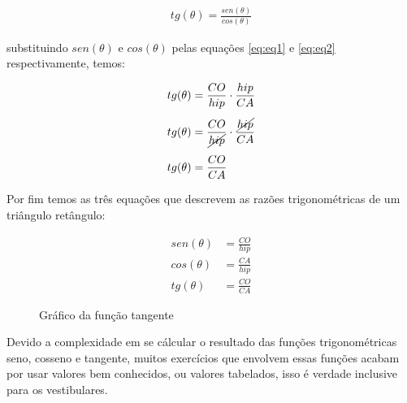 \begin{multicols*}{2}
    \begin{align*}
        tg(\theta) = \frac{sen(\theta)}{cos(\theta)}
    \end{align*}

    \noindent substituindo $sen(\theta)$ e $cos(\theta)$ pelas equações
    \eqref{eq:eq1} e \eqref{eq:eq2} respectivamente, temos:

    \begin{align}
        tg(\theta) & = \frac{CO}{hip}\cdot\frac{hip}{CA}                   \\[1ex]
        tg(\theta) & = \frac{CO}{\cancel{hip}}\cdot\frac{\cancel{hip}}{CA} \\[1ex]
        tg(\theta) & = \frac{CO}{CA}
    \end{align}

    Por fim temos as três equações que descrevem as razões trigonométricas de um
    triângulo retângulo:

    \begin{align}
        sen(\theta) & = \frac{CO}{hip} \\[1ex]
        cos(\theta) & = \frac{CA}{hip} \\[1ex]
        tg(\theta)  & = \frac{CO}{CA}
    \end{align}

    \begin{figure}[H]
        \centering
        \caption{Gráfico da função tangente}
    \end{figure}

    Devido a complexidade em se cálcular o resultado das funções trigonométricas
    seno, cosseno e tangente, muitos exercícios que envolvem essas funções acabam
    por usar valores bem conhecidos, ou valores tabelados, isso é verdade
    inclusive para os vestibulares.


\end{multicols*}
